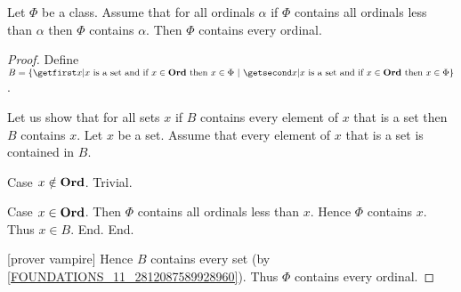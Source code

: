 \documentclass[../../set-theory/set-theory.tex]{subfiles}
\begin{document}
  \begin{forthel}
    \begin{theorem}
      Let $\Phi$ be a class.
      Assume that for all ordinals $\alpha$ if $\Phi$ contains all ordinals
      less than $\alpha$ then $\Phi$ contains $\alpha$.
      Then $\Phi$ contains every ordinal.
    \end{theorem}
    \begin{proof}
      Define $B = \class{x | \text{$x$ is a set and if $x \in \Ord$ then
      $x \in \Phi$}}$.

      Let us show that for all sets $x$ if $B$ contains every element of $x$
      that is a set then $B$ contains $x$.
        Let $x$ be a set.
        Assume that every element of $x$ that is a set is contained in $B$.

        Case $x \notin \mathbf{Ord}$. Trivial.

        Case $x \in \mathbf{Ord}$.
          Then $\Phi$ contains all ordinals less than $x$.
          Hence $\Phi$ contains $x$.
          Thus $x \in B$.
        End.
      End.

      [prover vampire] %
      Hence $B$ contains every set (by \ref{FOUNDATIONS_11_2812087589928960}).
      Thus $\Phi$ contains every ordinal.
    \end{proof}
  \end{forthel}
\end{document}
